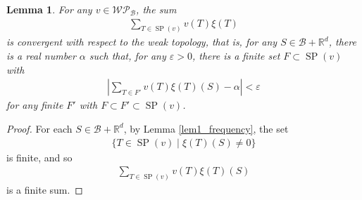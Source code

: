 \documentclass[a4]{amsart}
\DeclareMathOperator{\SP}{SP}
\newcommand{\WP}{\mathcal{W}\mathcal{P}}
\newtheorem{lem}[theorem]{Lemma}
\theoremstyle{definition}
\begin{document}
\begin{lem}
 For any $v\in\WP_{\mathcal{B}}$, the sum
\begin{align*}
   \sum_{T\in\SP(v)}v(T)\xi(T)
\end{align*}
is convergent with respect to the weak topology, that is, for any $S\in\mathcal{B}+\mathbb{R}^d$,
 there is a real number $\alpha$ such
that, for any  $\varepsilon>0$, 
there is a finite set $F\subset\SP(v)$ with
\begin{align*}
 \left|\sum_{T\in F'}v(T)\xi(T)(S)-\alpha\right|<\varepsilon
\end{align*}
for any finite $F'$ with $F\subset F'\subset\SP(v)$.
\end{lem}

\begin{proof}
  For each $S\in\mathcal{B}+\mathbb{R}^d$, by Lemma \ref{lem1_frequency}, the set
\begin{align*}
 \{T\in\SP(v)\mid \xi(T)(S)\neq 0\}
\end{align*}
is finite, and so
\begin{align*}
 \sum_{T\in\SP(v)}v(T)\xi(T)(S)
\end{align*}
is a finite sum.
\end{proof}
\end{document}
